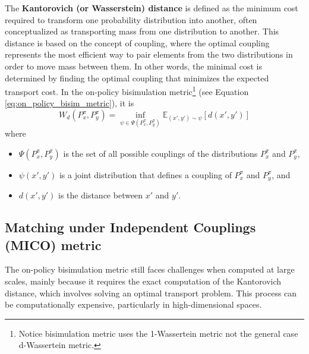 The \textbf{Kantorovich (or Wasserstein) distance} \cite{villani2009optimal} is defined as the minimum cost required to transform one probability distribution into another, often conceptualized as transporting mass from one distribution to another. This distance is based on the concept of coupling, where the optimal coupling represents the most efficient way to pair elements from the two distributions in order to move mass between them. In other words, the minimal cost is determined by finding the optimal coupling that minimizes the expected transport cost. In the on-policy bisimulation metric\footnote{Notice bisimulation metric uses the 1-Wassertein metric not the general case d-Wassertein metric.} (see Equation \ref{eq:on_policy_bisim_metric}), it is
\begin{equation}
W_d(P_{x}^\pi, P_{y}^\pi) = \inf_{\psi \in \Psi(P_{x}^\pi, P_{y}^\pi)} \mathbb{E}_{(x',y') \sim \psi} \left[ d(x', y') \right]
\end{equation}
where 
\begin{itemize}
    \item $\Psi(P_{x}^\pi, P_{y}^\pi)$ is the set of all possible couplings of the distributions $P_{x}^\pi$ and $P_{y}^\pi$,
    \item $\psi(x',y')$ is a joint distribution that defines a coupling of $P_{x}^\pi$ and $P_{y}^\pi$, and 
    \item $d(x',y')$ is the distance between $x'$ and $y'$.
\end{itemize}

\subsection{Matching under Independent Couplings (MICO) metric}

The on-policy bisimulation metric still faces challenges when computed at large scales, mainly because it requires the exact computation of the Kantorovich distance, which involves solving an optimal transport problem. This process can be computationally expensive, particularly in high-dimensional spaces.

